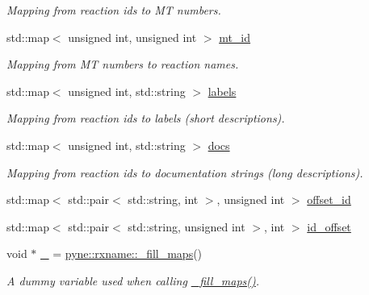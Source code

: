 \begin{DoxyCompactItemize}
\begin{DoxyCompactList}\small\item\em Mapping from reaction ids to MT numbers. \end{DoxyCompactList}\item 
std\+::map$<$ unsigned int, unsigned int $>$ \hyperlink{namespacepyne_1_1rxname_aca6dede953b1e7c1400ea23d40dce88c}{mt\+\_\+id}\hypertarget{namespacepyne_1_1rxname_aca6dede953b1e7c1400ea23d40dce88c}{}\label{namespacepyne_1_1rxname_aca6dede953b1e7c1400ea23d40dce88c}

\begin{DoxyCompactList}\small\item\em Mapping from MT numbers to reaction names. \end{DoxyCompactList}\item 
std\+::map$<$ unsigned int, std\+::string $>$ \hyperlink{namespacepyne_1_1rxname_a17fd6738dc8fcc8d08f3496926738364}{labels}\hypertarget{namespacepyne_1_1rxname_a17fd6738dc8fcc8d08f3496926738364}{}\label{namespacepyne_1_1rxname_a17fd6738dc8fcc8d08f3496926738364}

\begin{DoxyCompactList}\small\item\em Mapping from reaction ids to labels (short descriptions). \end{DoxyCompactList}\item 
std\+::map$<$ unsigned int, std\+::string $>$ \hyperlink{namespacepyne_1_1rxname_a1fcbb2b6dcf86e49cc70c4dfabf409ef}{docs}\hypertarget{namespacepyne_1_1rxname_a1fcbb2b6dcf86e49cc70c4dfabf409ef}{}\label{namespacepyne_1_1rxname_a1fcbb2b6dcf86e49cc70c4dfabf409ef}

\begin{DoxyCompactList}\small\item\em Mapping from reaction ids to documentation strings (long descriptions). \end{DoxyCompactList}\item 
std\+::map$<$ std\+::pair$<$ std\+::string, int $>$, unsigned int $>$ \hyperlink{namespacepyne_1_1rxname_a699be84310dad599582278e04135326e}{offset\+\_\+id}
\item 
std\+::map$<$ std\+::pair$<$ std\+::string, unsigned int $>$, int $>$ \hyperlink{namespacepyne_1_1rxname_ae2f5760c11dc39df3f90fbcc6584c95c}{id\+\_\+offset}
\item 
void $\ast$ \hyperlink{namespacepyne_1_1rxname_ac59f8c4154e812420e0dfef0388a592b}{\+\_\+} = \hyperlink{namespacepyne_1_1rxname_a4f97a2c91bfc51caf1e34eb21ed6c290}{pyne\+::rxname\+::\+\_\+fill\+\_\+maps}()\hypertarget{namespacepyne_1_1rxname_ac59f8c4154e812420e0dfef0388a592b}{}\label{namespacepyne_1_1rxname_ac59f8c4154e812420e0dfef0388a592b}

\begin{DoxyCompactList}\small\item\em A dummy variable used when calling \hyperlink{namespacepyne_1_1rxname_a4f97a2c91bfc51caf1e34eb21ed6c290}{\+\_\+fill\+\_\+maps()}. \end{DoxyCompactList}\end{DoxyCompactItemize}


